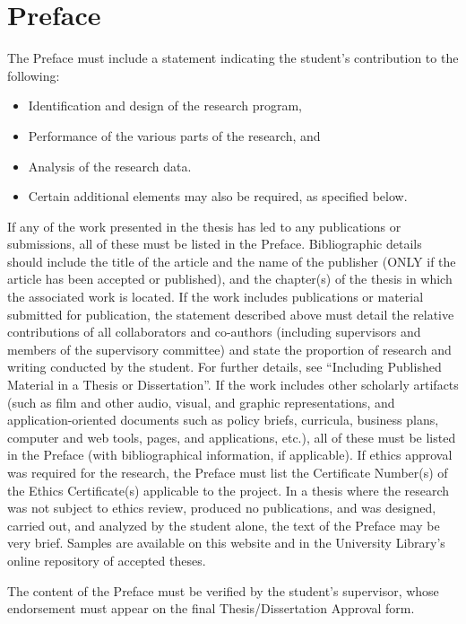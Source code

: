 
\chapter{Preface}

The Preface must include a statement indicating the student's contribution to the following:

\begin{itemize}
    \item Identification and design of the research program,
    \item Performance of the various parts of the research, and
    \item Analysis of the research data.
    \item Certain additional elements may also be required, as specified below.
\end{itemize}

If any of the work presented in the thesis has led to any publications or submissions, all of these must be listed in the Preface. 
Bibliographic details should include the title of the article and the name of the publisher (ONLY if the article has been accepted or published), and the chapter(s) of the thesis in which the associated work is located.
If the work includes publications or material submitted for publication, the statement described above must detail the relative contributions of all collaborators and co-authors (including supervisors and members of the supervisory committee) and state the proportion of research and writing conducted by the student. For further details, see “Including Published Material in a Thesis or Dissertation”.
If the work includes other scholarly artifacts (such as film and other audio, visual, and graphic representations, and application-oriented documents such as policy briefs, curricula, business plans, computer and web tools, pages, and applications, etc.), all of these must be listed in the Preface (with bibliographical information, if applicable).
If ethics approval was required for the research, the Preface must list the Certificate Number(s) of the Ethics Certificate(s) applicable to the project.
In a thesis where the research was not subject to ethics review, produced no publications, and was designed, carried out, and analyzed by the student alone, the text of the Preface may be very brief. Samples are available on this website and in the University Library's online repository of accepted theses.

The content of the Preface must be verified by the student's supervisor, whose endorsement must appear on the final Thesis/Dissertation Approval form.